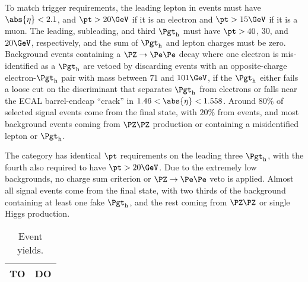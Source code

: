 To match trigger requirements, the leading lepton in \lttt events must have
$\abs{\eta} < 2.1$, and $\pt > 20\GeV$ if it is an electron and $\pt > 15\GeV$ if it is a muon.
The leading, subleading, and third
$\tauh$ must have $\pt > 40$, $30$, and $20\GeV$, respectively, and the sum of $\tauh$ and lepton charges must be zero.
Background events containing a $\Zee$ decay where one electron is mis-identified
as a $\tauh$ are vetoed by discarding events with an opposite-charge electron-$\tauh$
pair with mass between $71$ and $101\GeV$, if the $\tauh$ either fails a loose cut on the discriminant that separates $\tauh$ from electrons
or falls near the ECAL barrel-endcap ``crack'' in $1.46 < \abs{\eta} < 1.558$.  Around $80\%$ of selected signal events come
from the \tttt final state, with $20\%$ from \WWtt events, and most
background events coming from $\PZ\PZ$ production or containing a misidentified lepton or $\tauh$.

The \noltttt category has identical $\pt$ requirements on the leading three $\tauh$,
with the fourth \tauh also required to have $\pt > 20\GeV$.  Due to the extremely
low backgrounds, no charge sum criterion or $\Zee$ veto is applied.  Almost
all signal events come from the \tttt final state, with two thirds of the
background containing at least one fake $\tauh$, and the rest coming from $\PZ\PZ$ or single
Higgs production.

\begin{table}[!h]
\begin{center}
\begin{tabular}{|c|c|}

\hline
TO & DO \\
\hline

\end{tabular}
\end{center}
\caption{
  Event yields.
}
\label{tab:event_yields}
\end{table}

